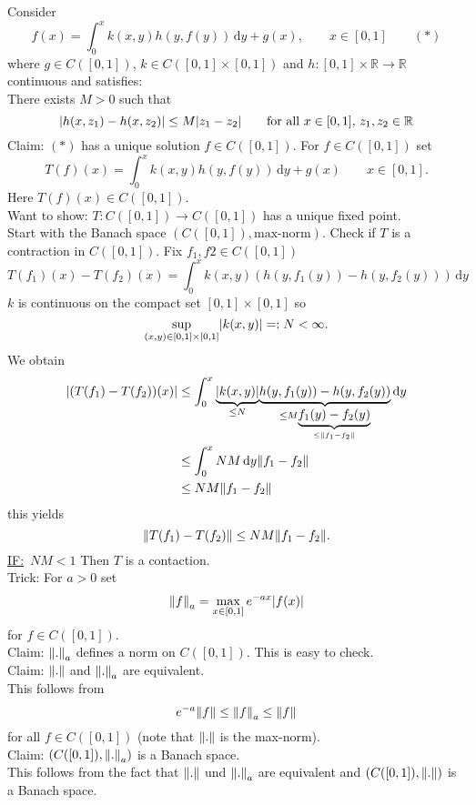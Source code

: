 \begin{beispiel}
	Consider
	\[
		f(x) = \int_{0}^{x}k(x,y)h(y,f(y)) \,\mathrm{d}y + g(x), \qquad x \in [0,1] \qquad (*)
	\]
	where $g \in C([0,1])$, $k \in C([0,1] \times [0,1])$ and $h: [0,1] \times \mathbb{R} \to \mathbb{R}$ continuous and satisfies: \\
	There exists $M>0$ such that
	\[
		\lvert h(x,z_1)-h(x,z_2)\rvert \leq M \lvert z_1- z_2\rvert \qquad \text{for all }x \in [0,1],\,z_1,z_2 \in \mathbb{R}
	\]
	Claim: $(*)$ has a unique solution $f \in C([0,1])$. For $f \in C([0,1])$ set
	\[
		T(f)(x) = \int_{0}^{x}k(x,y)h(y,f(y)) \,\mathrm{d}y + g(x) \qquad x \in [0,1].
	\]
	Here $T(f)(x) \in C([0,1])$. \\ Want to show: $T: C([0,1]) \to C([0,1])$ has a unique fixed point. \\
	Start with the Banach space $(C([0,1]), \text{max-norm})$. Check if $T$ is a contraction in $C([0,1])$. Fix $f_1,f2 \in C([0,1])$
	\[
		T(f_1)(x)- T(f_2)(x) = \int_{0}^{x} k(x,y)(h(y,f_1(y))-h(y,f_2(y))) \,\mathrm{d}y
	\] 
	$k$ is continuous on the compact set $[0,1] \times [0,1]$ so 
	\[
		\sup\limits_{(x,y) \in [0,1]\times[0,1]} \lvert k(x,y)\rvert =: N < \infty.
	\]
	We obtain 
	\begin{align*}
		\abs{(T(f_1)-T(f_2))(x)} &\leq \int_{0}^{x} \underset{\leq N}{\underbrace{\abs{k(x,y)}}}\underset{\leq M \underset{\leq \norm{f_1-f_2}}{\underbrace{f_1(y)-f_2(y)}}}{\underbrace{h(y,f_1(y))-h(y,f_2(y))}} \,\mathrm{d}y \\ & \leq \int_{0}^{x}NM \,\mathrm{d}y \norm{f_1-f_2} \\& \leq NM \norm{f_1-f_2}
		\end{align*}
	this yields
	\[
		\norm{T(f_1)-T(f_2)} \leq NM \norm{f_1-f_2}.
	\]
	\underline{IF:} \,$NM<1$ Then $T$ is a contaction. \\ Trick: For $a >0$ set 
	\[
		\norm{f}_a = \max\limits_{x \in [0,1]} e^{-ax}\abs{f(x)}
	\] 
	for $f \in C([0,1])$. \\
	Claim: $\norm{.}_a$ defines a norm on $C([0,1])$. This is easy to check. \\
	Claim: $\norm{.}$ and $\norm{.}_a$ are equivalent. \\
	This follows from
	\[
		e^{-a} \norm{f} \leq \norm{f}_a \leq \norm{f}
	\]
	for all $f \in C([0,1])$ (note that $\norm{.}$ is the max-norm).\\
	Claim: $(C([0,1]), \norm{.}_a)$ is a Banach space. \\
	This follows from the fact that $\norm{.}$ und $\norm{.}_a$ are equivalent and $(C([0,1]),\norm{.})$ is a Banach space. \\

\end{beispiel}
